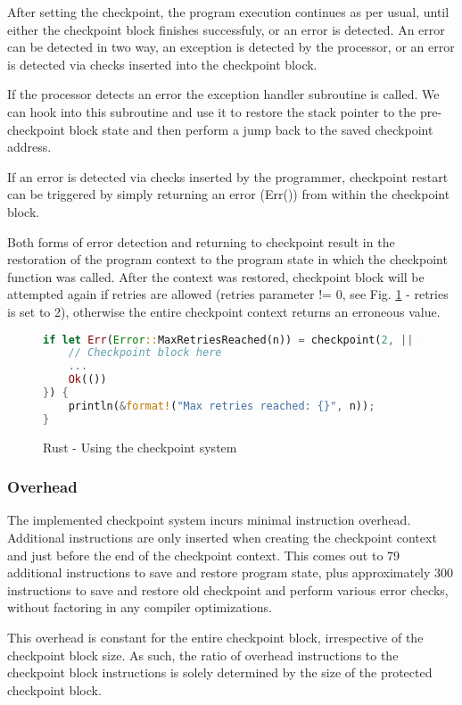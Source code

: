 After setting the checkpoint, the program execution continues as per usual, until either the checkpoint block finishes successfuly, or an error is detected. An error can be detected in two way, an exception is detected by the processor, or an error is detected via checks inserted into the checkpoint block.

If the processor detects an error the exception handler subroutine is called. We can hook into this subroutine and use it to restore the stack pointer to the pre-checkpoint block state and then perform a jump back to the saved checkpoint address.

If an error is detected via checks inserted by the programmer, checkpoint restart can be triggered by simply returning an error (Err()) from within the checkpoint block.

Both forms of error detection and returning to checkpoint result in the restoration of the program context to the program state in which the checkpoint function was called. After the context was restored, checkpoint block will be attempted again if retries are allowed (retries parameter != 0, see Fig. \ref{fig:rust_using_checkpoint} - retries is set to 2), otherwise the entire checkpoint context returns an erroneous value.

\begin{figure}[!h]
\begin{lstlisting}[language=Rust]
if let Err(Error::MaxRetriesReached(n)) = checkpoint(2, || {
    // Checkpoint block here
    ...
    Ok(())
}) {
    println(&format!("Max retries reached: {}", n));
}
\end{lstlisting}
\caption{Rust - Using the checkpoint system}
\label{fig:rust_using_checkpoint}
\end{figure}

\subsubsection{Overhead}

The implemented checkpoint system incurs minimal instruction overhead. Additional instructions are only inserted when creating the checkpoint context and just before the end of the checkpoint context. This comes out to 79 additional instructions to save and restore program state, plus approximately 300 instructions to save and restore old checkpoint and perform various error checks, without factoring in any compiler optimizations.

This overhead is constant for the entire checkpoint block, irrespective of the checkpoint block size. As such, the ratio of overhead instructions to the checkpoint block instructions is solely determined by the size of the protected checkpoint block.


